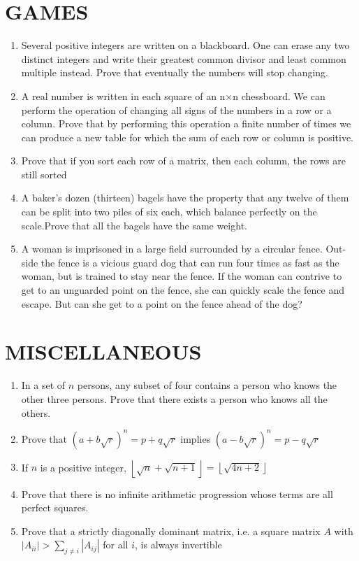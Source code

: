 \documentclass[12pt]{article}
\newcommand{\floor}[1]{\left\lfloor #1 \right\rfloor}
\begin{document}
\section{GAMES}
\begin{enumerate}
    \item Several positive integers are written on a blackboard. One can erase any two distinct integers and write their greatest common divisor and least common multiple instead. Prove that eventually the numbers will stop changing.
    \item A real number is written in each square of an n×n chessboard. We can perform the operation of changing all signs of the numbers in a row or a column. Prove that by performing this operation a finite number of times we can produce a new table for which the sum of each row or column is positive.
    \item Prove that if you sort each row of a matrix, then each column, the rows are still sorted
    \item A baker’s dozen (thirteen) bagels have the property that any twelve of them can be split into two piles of six each, which balance perfectly on the scale.Prove that all the bagels have the same weight.
    \item A woman is imprisoned in a large ﬁeld surrounded by a circular fence. Out-side the fence is a vicious guard dog that can run four times as fast as the woman, but is trained to stay near the fence. If the woman can contrive to get to an unguarded point on the fence, she can quickly scale the fence and escape. But can she get to a point on the fence ahead of the dog?
\end{enumerate}

\section{MISCELLANEOUS}
\begin{enumerate}
    \item In a set of $n$ persons, any subset of four contains a person who knows the other three persons. Prove that there exists a person who knows all the others.
    \item Prove that $(a+b \sqrt{r})^n=p+q \sqrt{r}$ implies $(a-b \sqrt{r})^n = p-q \sqrt{r}$
    \item If $n$ is a positive integer, $\floor{\sqrt{n}+\sqrt{n+1}}=\floor{\sqrt{4n+2}}$
    \item Prove that there is no infinite arithmetic progression whose terms are all perfect squares.
    \item Prove that a strictly diagonally dominant matrix, i.e. a square matrix $A$ with $|A_{ii}|>\sum_{j\neq i}|A_{ij}|$ for all $i$, is always invertible

\end{enumerate}
\pagebreak
\end{document}
